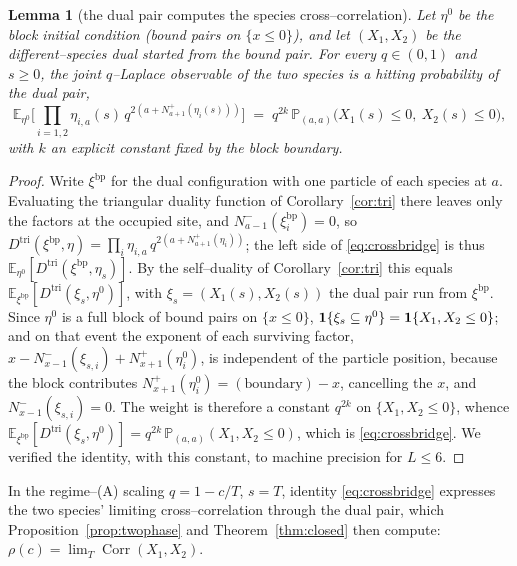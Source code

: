 \documentclass[11pt]{article}
\theoremstyle{plain}
\newtheorem{lemma}[theorem]{Lemma}
\theoremstyle{definition}
\theoremstyle{remark}
\DeclareMathOperator{\Corr}{Corr}\DeclareMathOperator{\cum}{cum}
\newcommand{\E}{\mathbb{E}}\newcommand{\PP}{\mathbb{P}}\newcommand{\dd}{\,\mathrm{d}}
\begin{document}
\begin{lemma}[the dual pair computes the species cross--correlation]\label{lem:crossbridge}
Let $\eta^0$ be the block initial condition (bound pairs on $\{x\le0\}$), and let
$(X_1,X_2)$ be the different--species dual started from the bound pair. For every
$q\in(0,1)$ and $s\ge0$, the joint $q$--Laplace observable of the two species is a
hitting probability of the dual pair,
\begin{equation}\label{eq:crossbridge}
  \E_{\eta^0}\Big[\textstyle\prod_{i=1,2}\eta_{i,a}(s)\,
     q^{2\left(a+N^+_{a+1}(\eta_i(s))\right)}\Big]
   \;=\; q^{2k}\,\PP_{(a,a)}\big(X_1(s)\le0,\ X_2(s)\le0\big),
\end{equation}
with $k$ an explicit constant fixed by the block boundary.
\end{lemma}
\begin{proof}
Write $\xi^{\mathrm{bp}}$ for the dual configuration with one particle of each species at
$a$. Evaluating the triangular duality function of Corollary~\ref{cor:tri} there leaves
only the factors at the occupied site, and $N^-_{a-1}(\xi^{\mathrm{bp}}_i)=0$, so
$D^{\mathrm{tri}}(\xi^{\mathrm{bp}},\eta)=\prod_i\eta_{i,a}\,q^{2(a+N^+_{a+1}(\eta_i))}$;
the left side of \eqref{eq:crossbridge} is thus
$\E_{\eta^0}[D^{\mathrm{tri}}(\xi^{\mathrm{bp}},\eta_s)]$. By the self--duality of
Corollary~\ref{cor:tri} this equals $\E_{\xi^{\mathrm{bp}}}[D^{\mathrm{tri}}(\xi_s,\eta^0)]$,
with $\xi_s=(X_1(s),X_2(s))$ the dual pair run from $\xi^{\mathrm{bp}}$. Since $\eta^0$ is
a full block of bound pairs on $\{x\le0\}$, $\mathbf 1\{\xi_s\subseteq\eta^0\}=\mathbf 1\{X_1,X_2\le0\}$;
and on that event the exponent of each surviving factor,
$x-N^-_{x-1}(\xi_{s,i})+N^+_{x+1}(\eta^0_i)$, is independent of the particle position,
because the block contributes $N^+_{x+1}(\eta^0_i)=(\text{boundary})-x$, cancelling the
$x$, and $N^-_{x-1}(\xi_{s,i})=0$. The weight is therefore a constant $q^{2k}$ on
$\{X_1,X_2\le0\}$, whence
$\E_{\xi^{\mathrm{bp}}}[D^{\mathrm{tri}}(\xi_s,\eta^0)]=q^{2k}\,\PP_{(a,a)}(X_1,X_2\le0)$,
which is \eqref{eq:crossbridge}. We verified the identity, with this constant, to machine
precision for $L\le6$.
\end{proof}

In the regime--(A) scaling $q=1-c/T$, $s=T$, identity \eqref{eq:crossbridge} expresses the
two species' limiting cross--correlation through the dual pair, which
Proposition~\ref{prop:twophase} and Theorem~\ref{thm:closed} then compute:
$\rho(c)=\lim_T\Corr(X_1,X_2)$.
\end{document}
